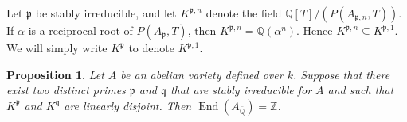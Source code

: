 \documentclass[oneside]{amsart}
\newtheorem{proposition}[theorem]{Proposition}
\theoremstyle{remark}
\newcommand{\Q}{\mathbb Q}
\newcommand{\Qbar}{{\overline{\mathbb Q}}}
\newcommand{\End}{\operatorname{End}}
\newcommand{\p}{\mathfrak{p}}
\newcommand{\fq}{\mathfrak{q}}
\numberwithin{equation}{section}
\newcommand{\ZZ}{\mathbb{Z}}
\begin{document}



Let $\p$ be stably irreducible, and let $K^{\p,n}$ denote the field $\Q[T]/(P(A_{\p,n},T))$. If $\alpha$ is a reciprocal root of $P(A_{\p},T)$, then $K^{\p,n}=\Q(\alpha^ n)$. Hence $K^{\p,n}\subseteq K^{\p,1}$. We will simply write $K^{\p}$ to denote $K^{\p,1}$.

\begin{proposition}\label{prop:criterion}
Let $A$ be an abelian variety defined over $k$. Suppose that there exist two distinct primes $\p$ and $\fq$ that are stably irreducible for $A$ and such that $K^{\p}$ and $ K^{\fq}$ are linearly disjoint. Then $\End(A_\Qbar)=\ZZ$.
\end{proposition}
\end{document}
